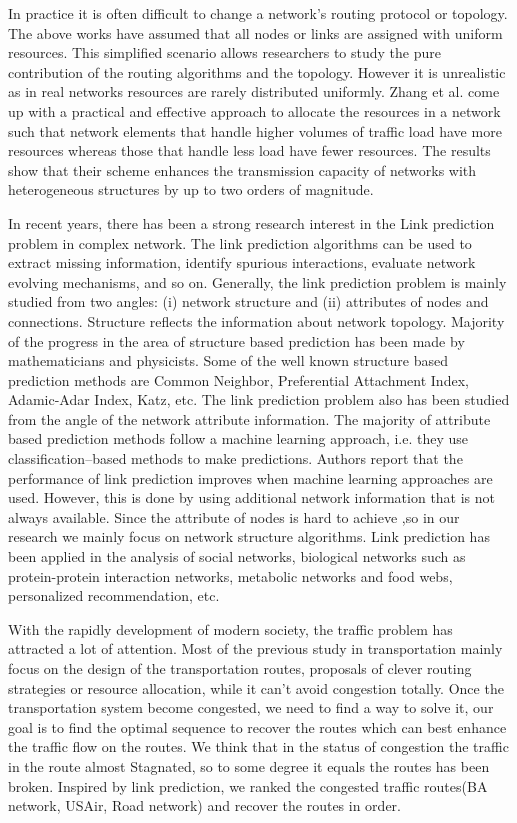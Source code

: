 \documentclass[onecolumn,preprintnumbers,amsmath,amssymb]{revtex4}
\begin{document}
In practice it is often difficult to change a network’s routing protocol or topology. The above works have assumed that all nodes or links are assigned with uniform
resources. This simplified scenario allows researchers to study the pure contribution of the routing algorithms and the topology. However it is unrealistic as in real networks resources are rarely distributed uniformly.
Zhang et al. come up with a practical and effective approach to allocate the resources in a network such that network elements that handle higher volumes of traffic load have more resources whereas those that handle less load have fewer resources. The results show that their scheme enhances the transmission capacity of networks with heterogeneous structures by up to two orders of magnitude\cite{GQZ}.


In recent years, there has been a strong research interest in the Link prediction problem in complex network. The link prediction algorithms can be used to extract missing information, identify spurious interactions, evaluate network evolving mechanisms, and so on. Generally, the link prediction problem is mainly studied from two angles: (i) network structure and (ii) attributes of nodes and connections. Structure reflects the information about network topology. Majority of the progress in the area of structure based prediction has been made by mathematicians and physicists. Some of the well known structure based prediction methods are Common Neighbor, Preferential Attachment Index, Adamic-Adar Index, Katz, etc. The link prediction problem also has been studied from the angle of the network attribute information. The majority of attribute based prediction methods follow a machine learning approach, i.e. they use classification–based methods to make predictions. Authors \cite{LPU,NPA,LPC,WWC,SRM} report that the performance of link prediction improves when machine learning approaches are used. However, this is done by using additional network information that is not always available. Since the attribute of nodes is hard to achieve ,so in our research we mainly focus on network structure algorithms. Link prediction has been applied in the analysis of social networks, biological networks such as protein-protein interaction networks, metabolic networks and food webs, personalized recommendation, etc\cite{NHS,TOM,SPR,TZ,SAD,CAA}. 


With the rapidly development of modern society, the traffic problem has attracted a lot of attention. Most of the previous study in transportation mainly focus on the design of the transportation routes, proposals of clever routing strategies or resource allocation, while it can't avoid congestion totally. Once the transportation system become congested, we need to find a way to solve it, our goal is to find the optimal sequence to recover the routes which can best enhance the traffic flow on the routes. We think that in the status of congestion the traffic in the route almost Stagnated, so to some degree it equals the routes has been broken. Inspired by link prediction, we ranked the congested traffic routes(BA network, USAir, Road network) and recover the routes in order. 
\end{document}
